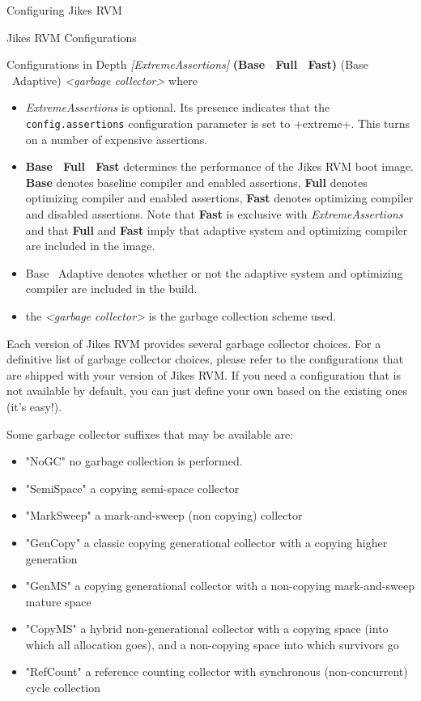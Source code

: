 \begin{chapter}{Configuring Jikes RVM}
\begin{section}{Jikes RVM Configurations}
\begin{subsection}{Configurations in Depth}
\textit{[ExtremeAssertions]} \textbf{(Base \textbar\ Full \textbar\ Fast)} (Base \textbar\ Adaptive) \textit{\textless garbage collector\textgreater }
where
\begin{itemize}
  \item \textit{ExtremeAssertions} is optional. Its presence indicates that the \texttt{con\-fig.as\-ser\-tions} configuration parameter is set to \spverb+extreme+. This turns on a number of expensive assertions.
  \item \textbf{Base \textbar\ Full \textbar\ Fast} determines the performance of the Jikes RVM boot image. \textbf{Base} denotes baseline compiler and enabled assertions, \textbf{Full} denotes optimizing compiler and enabled assertions, \textbf{Fast} denotes optimizing compiler and disabled assertions. Note that \textbf{Fast} is exclusive with \textit{ExtremeAssertions} and that \textbf{Full} and \textbf{Fast} imply that adaptive system and optimizing compiler are included in the image.
  \item Base \textbar\ Adaptive denotes whether or not the adaptive system and optimizing compiler are included in the build.
  \item the \textit{\textless garbage collector\textgreater} is the garbage collection scheme used.
\end{itemize}

Each version of Jikes RVM provides several garbage collector choices. For a definitive list of garbage collector choices, please refer to the configurations that are shipped with your version of Jikes RVM. If you need a configuration that is not available by default, you can just define your own based on the existing ones (it's easy!).

Some garbage collector suffixes that may be available are:
\begin{itemize}
  \item "NoGC" no garbage collection is performed.
  \item "SemiSpace" a copying semi-space collector
  \item "MarkSweep" a mark-and-sweep (non copying) collector
  \item "GenCopy" a classic copying generational collector with a copying higher generation
  \item "GenMS" a copying generational collector with a non-copying mark-and-sweep mature space
  \item "CopyMS" a hybrid non-generational collector with a copying space (into which all allocation goes), and a non-copying space into which survivors go
  \item "RefCount" a reference counting collector with synchronous (non\hyp concurrent) cycle collection
\end{itemize}


\end{subsection}
\end{section}
\end{chapter}
